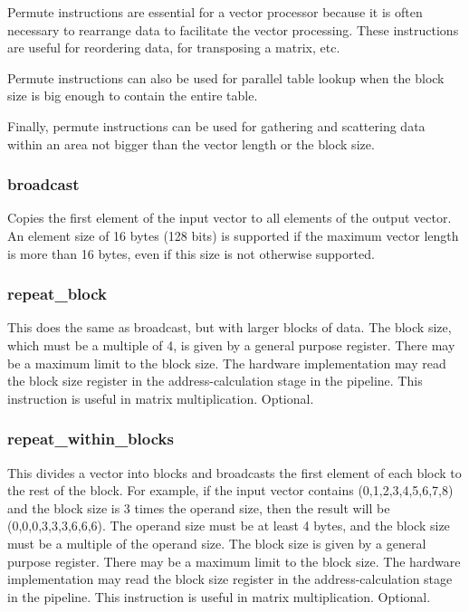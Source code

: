 \documentclass[forwardcom.tex]{subfiles}
\begin{document}
Permute instructions are essential for a vector processor because it is often necessary to rearrange data to facilitate the vector processing. These instructions are useful for reordering data, for transposing a matrix, etc. 
\vspace{2mm}

Permute instructions can also be used for parallel table lookup when the block size is big enough to contain the entire table.
\vspace{2mm}

Finally, permute instructions can be used for gathering and scattering data within an area not bigger than the vector length or the block size.

\subsubsection{broadcast}
Copies the first element of the input vector to all elements of the output vector. An element size of 16 bytes (128 bits) is supported if the maximum vector length is more than 16 bytes, even if this size is not otherwise supported.

\subsubsection{repeat\_block}
This does the same as broadcast, but with larger blocks of data. The block size, which must be a multiple of 4, is given by a general purpose register. There may be a maximum limit to the block size. The hardware implementation may read the block size register in the address-calculation stage in the pipeline. 
This instruction is useful in matrix multiplication. Optional.

\subsubsection{repeat\_within\_blocks}
This divides a vector into blocks and broadcasts the first element of each block to the rest of the block. For example, if the input vector contains (0,1,2,3,4,5,6,7,8) and the block size is 3 times the operand size, then the result will be (0,0,0,3,3,3,6,6,6).
The operand size must be at least 4 bytes, and the block size must be a multiple of the operand size. The block size is given by a general purpose register. There may be a maximum limit to the block size. The hardware implementation may read the block size register in the address-calculation stage in the pipeline. This instruction is useful in matrix multiplication. Optional.
\end{document}
